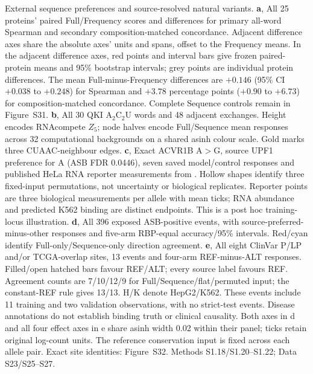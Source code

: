\caption{External sequence preferences and source-resolved natural variants. \textbf{a}, All 25 proteins' paired Full/Frequency scores and differences for primary all-word Spearman and secondary composition-matched concordance. Adjacent difference axes share the absolute axes' units and spans, offset to the Frequency means. In the adjacent difference axes, red points and interval bars give frozen paired-protein means and 95\% bootstrap intervals; grey points are individual protein differences. The mean Full-minus-Frequency differences are $+0.146$ (95\% CI $+0.038$ to $+0.248$) for Spearman and $+3.78$ percentage points ($+0.90$ to $+6.73$) for composition-matched concordance. Complete Sequence controls remain in Figure~S31. \textbf{b}, All 30 QKI A$_2$C$_2$U words and 48 adjacent exchanges. Height encodes RNAcompete $Z_5$; node halves encode Full/Sequence mean responses across 32 computational backgrounds on a shared asinh colour scale. Gold marks three CUAAC-neighbour edges. \textbf{c}, Exact ACVR1B A$>$G, source UPF1 preference for A (ASB FDR 0.0446), seven saved model/control responses and published HeLa RNA reporter measurements from \citet{yang2019asb}. Hollow shapes identify three fixed-input permutations, not uncertainty or biological replicates. Reporter points are three biological measurements per allele with mean ticks; RNA abundance and predicted K562 binding are distinct endpoints. This is a post hoc training-locus illustration. \textbf{d}, All 396 exposed ASB-positive events, with source-preferred-minus-other responses and five-arm RBP-equal accuracy/95\% intervals. Red/cyan identify Full-only/Sequence-only direction agreement. \textbf{e}, All eight ClinVar P/LP and/or TCGA-overlap sites, 13 events and four-arm REF-minus-ALT responses. Filled/open hatched bars favour REF/ALT; every source label favours REF. Agreement counts are 7/10/12/9 for Full/Sequence/flat/permuted input; the constant-REF rule gives 13/13. H/K denote HepG2/K562. These events include 11 training and two validation observations, with no strict-test events. Disease annotations do not establish binding truth or clinical causality. Both axes in d and all four effect axes in e share asinh width 0.02 within their panel; ticks retain original log-count units. The reference conservation input is fixed across each allele pair. Exact site identities: Figure~S32. Methods S1.18/S1.20--S1.22; Data S23/S25--S27.}
